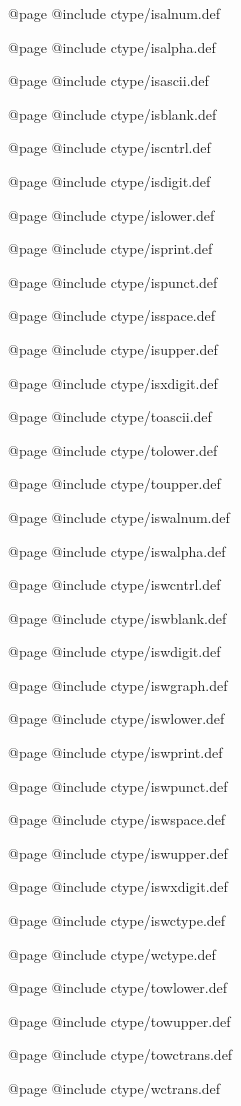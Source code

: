 @page
@include ctype/isalnum.def

@page
@include ctype/isalpha.def

@page
@include ctype/isascii.def

@page
@include ctype/isblank.def

@page
@include ctype/iscntrl.def

@page
@include ctype/isdigit.def

@page
@include ctype/islower.def

@page
@include ctype/isprint.def

@page
@include ctype/ispunct.def

@page
@include ctype/isspace.def

@page
@include ctype/isupper.def

@page
@include ctype/isxdigit.def

@page
@include ctype/toascii.def

@page
@include ctype/tolower.def

@page
@include ctype/toupper.def

@page
@include ctype/iswalnum.def

@page
@include ctype/iswalpha.def

@page
@include ctype/iswcntrl.def

@page
@include ctype/iswblank.def

@page
@include ctype/iswdigit.def

@page
@include ctype/iswgraph.def

@page
@include ctype/iswlower.def

@page
@include ctype/iswprint.def

@page
@include ctype/iswpunct.def

@page
@include ctype/iswspace.def

@page
@include ctype/iswupper.def

@page
@include ctype/iswxdigit.def

@page
@include ctype/iswctype.def

@page
@include ctype/wctype.def

@page
@include ctype/towlower.def

@page
@include ctype/towupper.def

@page
@include ctype/towctrans.def

@page
@include ctype/wctrans.def

